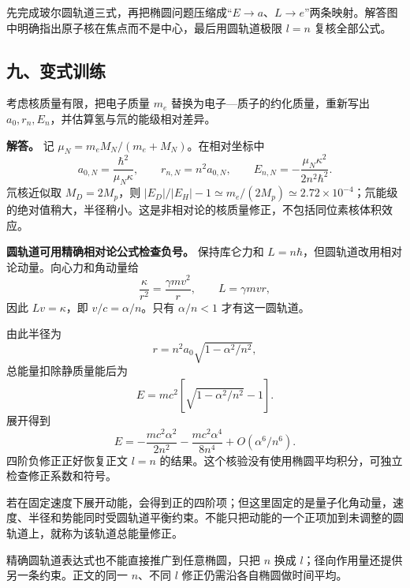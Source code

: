 \documentclass[12pt,a4paper,UTF8]{ctexart}
\begin{document}
先完成玻尔圆轨道三式，再把椭圆问题压缩成``\(E\to a\)、\(L\to e\)''两条映射。解答图中明确指出原子核在焦点而不是中心，最后用圆轨道极限
\(l=n\) 复核全部公式。

\subsection{九、变式训练}\label{ux4e5dux53d8ux5f0fux8badux7ec3-7}

考虑核质量有限，把电子质量 \(m_e\) 替换为电子---质子的约化质量，重新写出
\(a_0,r_n,E_n\)，并估算氢与氘的能级相对差异。

\textbf{解答。} 记 \(\mu_N=m_eM_N/(m_e+M_N)\)。在相对坐标中 \[
a_{0,N}=\frac{\hbar^2}{\mu_N\kappa},\qquad r_{n,N}=n^2a_{0,N},\qquad
E_{n,N}=-\frac{\mu_N\kappa^2}{2n^2\hbar^2}.
\] 氘核近似取 \(M_D=2M_p\)，则
\(|E_D|/|E_H|-1\simeq m_e/(2M_p)\simeq2.72\times10^{-4}\)；氘能级的绝对值稍大，半径稍小。这是非相对论的核质量修正，不包括同位素核体积效应。

\textbf{圆轨道可用精确相对论公式检查负号。} 保持库仑力和
\(L=n\hbar\)，但圆轨道改用相对论动量。向心力和角动量给 \[
\frac\kappa{r^2}=\frac{\gamma mv^2}{r},
\qquad L=\gamma mvr,
\] 因此 \(Lv=\kappa\)，即 \(v/c=\alpha/n\)。只有 \(\alpha/n<1\)
才有这一圆轨道。

由此半径为 \[
r=n^2a_0\sqrt{1-\alpha^2/n^2},
\] 总能量扣除静质量能后为 \[
E=mc^2\left[\sqrt{1-\alpha^2/n^2}-1\right].
\] 展开得到 \[
E=-\frac{mc^2\alpha^2}{2n^2}-
\frac{mc^2\alpha^4}{8n^4}+O(\alpha^6/n^6).
\] 四阶负修正正好恢复正文 \(l=n\)
的结果。这个核验没有使用椭圆平均积分，可独立检查修正系数和符号。

若在固定速度下展开动能，会得到正的四阶项；但这里固定的是量子化角动量，速度、半径和势能同时受圆轨道平衡约束。不能只把动能的一个正项加到未调整的圆轨道上，就称为该轨道总能量修正。

精确圆轨道表达式也不能直接推广到任意椭圆，只把 \(n\) 换成
\(l\)；径向作用量还提供另一条约束。正文的同一 \(n\)、不同 \(l\)
修正仍需沿各自椭圆做时间平均。
\end{document}

